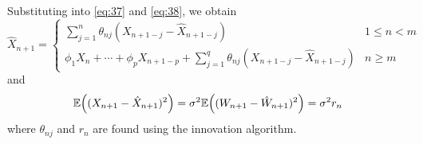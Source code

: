 \begin{lem}
  Substituting into \eqref{eq:37} and \eqref{eq:38}, we obtain
  \begin{equation}
    \label{eq:41}
    \hat X_{n+1} =
    \begin{cases}
      \sum_{j=1}^{n} \theta_{nj}(X_{n+1-j} - \hat X_{n+1-j}) & 1 \leq n < m \\
      \phi_{1} X_{n} + \cdots + \phi_{p} X_{n+1-p} + \sum_{j=1}^{q}
      \theta_{nj}(X_{n+1-j} - \hat X_{n+1-j}) & n \geq m
    \end{cases}
  \end{equation}
  and
  \begin{equation}
    \label{eq:42}
    \E{(X_{n+1} - \hat X_{n+1})^{2}} = \sigma^{2} \E{(W_{n+1} - \hat
      W_{n+1})^{2}} = \sigma^{2} r_{n}
  \end{equation}
  where $\theta_{nj}$ and $r_{n}$ are found using the innovation algorithm.
\end{lem}

